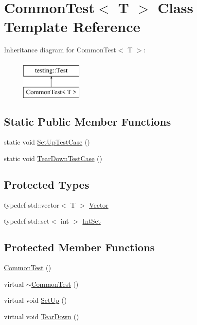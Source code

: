 \hypertarget{classCommonTest}{}\section{Common\+Test$<$ T $>$ Class Template Reference}
\label{classCommonTest}
Inheritance diagram for Common\+Test$<$ T $>$\+:\begin{figure}[H]
\begin{center}
\leavevmode
\includegraphics[height=2.000000cm]{classCommonTest}
\end{center}
\end{figure}
\subsection*{Static Public Member Functions}
\begin{DoxyCompactItemize}
\item 
static void \mbox{\hyperlink{classCommonTest_a6edd90f32f45cc49e4a423b22bd770ce}{Set\+Up\+Test\+Case}} ()
\item 
static void \mbox{\hyperlink{classCommonTest_a68d2bf5108cf28478331588fbdff4838}{Tear\+Down\+Test\+Case}} ()
\end{DoxyCompactItemize}
\subsection*{Protected Types}
\begin{DoxyCompactItemize}
\item 
typedef std\+::vector$<$ T $>$ \mbox{\hyperlink{classCommonTest_a6dfdcede6964887b9f4254a0e0478e37}{Vector}}
\item 
typedef std\+::set$<$ int $>$ \mbox{\hyperlink{classCommonTest_a62827e9d3064cddf4a8698747f1bd434}{Int\+Set}}
\end{DoxyCompactItemize}
\subsection*{Protected Member Functions}
\begin{DoxyCompactItemize}
\item 
\mbox{\hyperlink{classCommonTest_abd5ec205d90f4b81efab2a6f972f3db0}{Common\+Test}} ()
\item 
virtual \mbox{\hyperlink{classCommonTest_a675a632fcf7b1fd961fefc619d6a458d}{$\sim$\+Common\+Test}} ()
\item 
virtual void \mbox{\hyperlink{classCommonTest_a4c7bf7889ce48a9d06530bc4a437f3f5}{Set\+Up}} ()
\item 
virtual void \mbox{\hyperlink{classCommonTest_aeae195c2cefa956c6ae5be1226e6ecd8}{Tear\+Down}} ()
\end{DoxyCompactItemize}
